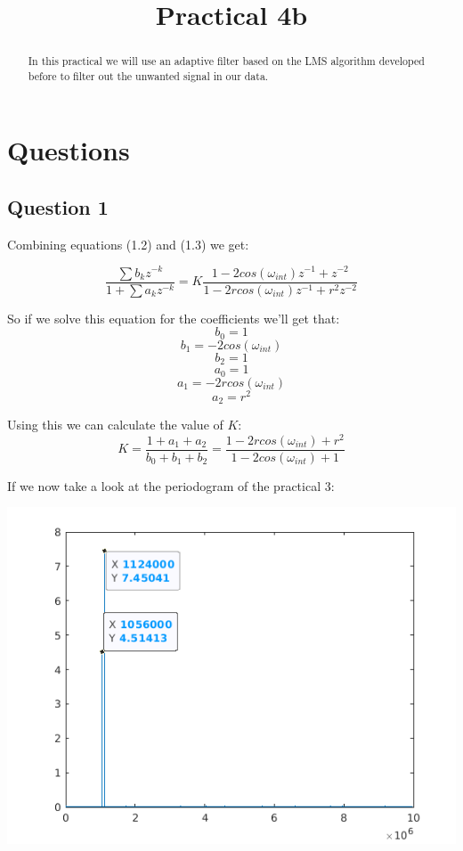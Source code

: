 \documentclass[conference,9pt]{IEEEtran}
\begin{document}
\title{Practical 4b}

\author{
}

\maketitle
\begin{abstract}
In this practical we will use an adaptive filter based on the LMS algorithm developed before to filter out the unwanted signal in our data.
\end{abstract}

\section{Questions}

\subsection{Question 1}
Combining equations (1.2) and (1.3) we get:

$$\frac{\sum b_k z^{-k}}{1 + \sum a_k z^{-k}} = K\frac{1-2cos(\omega_{int})z^{-1} + z^{-2}}{1- 2rcos(\omega_{int})z^{-1}+r^2z^{-2}}$$

So if we solve this equation for the coefficients we'll get that:
$$b_0=1$$
$$b_1=-2cos(\omega_{int})$$
$$b_2=1$$
$$a_0=1$$
$$a_1=-2rcos(\omega_{int})$$
$$a_2=r^2$$

Using this we can calculate the value of $K$:
$$K=\frac{1 + a_1+a_2}{b_0+b_1+b_2}=\frac{1-2rcos(\omega_{int})+r^2}{1-2cos(\omega_{int})+1}$$

If we now take a look at the periodogram of the practical 3:

\includegraphics[scale=0.6]{perio.png}
\end{document}
